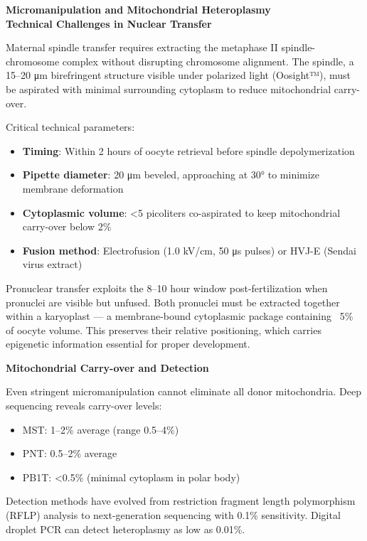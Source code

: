 \begin{technical}
{\Large\textbf{Micromanipulation and Mitochondrial Heteroplasmy}}\\[0.7em]

\noindent\textbf{Technical Challenges in Nuclear Transfer}

Maternal spindle transfer requires extracting the metaphase II spindle-chromosome complex without disrupting chromosome alignment. The spindle, a 15–20 μm birefringent structure visible under polarized light (Oosight™), must be aspirated with minimal surrounding cytoplasm to reduce mitochondrial carry-over.

Critical technical parameters:
\begin{itemize}[leftmargin=*]
\item \textbf{Timing}: Within 2 hours of oocyte retrieval before spindle depolymerization
\item \textbf{Pipette diameter}: 20 μm beveled, approaching at 30° to minimize membrane deformation
\item \textbf{Cytoplasmic volume}: <5 picoliters co-aspirated to keep mitochondrial carry-over below 2\%
\item \textbf{Fusion method}: Electrofusion (1.0 kV/cm, 50 μs pulses) or HVJ-E (Sendai virus extract)
\end{itemize}

Pronuclear transfer exploits the 8–10 hour window post-fertilization when pronuclei are visible but unfused. Both pronuclei must be extracted together within a karyoplast — a membrane-bound cytoplasmic package containing ~5\% of oocyte volume. This preserves their relative positioning, which carries epigenetic information essential for proper development.

\noindent\textbf{Mitochondrial Carry-over and Detection}

Even stringent micromanipulation cannot eliminate all donor mitochondria. Deep sequencing reveals carry-over levels:
\begin{itemize}[leftmargin=*]
\item MST: 1–2\% average (range 0.5–4\%)
\item PNT: 0.5–2\% average
\item PB1T: <0.5\% (minimal cytoplasm in polar body)
\end{itemize}

Detection methods have evolved from restriction fragment length polymorphism (RFLP) analysis to next-generation sequencing with 0.1\% sensitivity. Digital droplet PCR can detect heteroplasmy as low as 0.01\%.


\end{technical}
